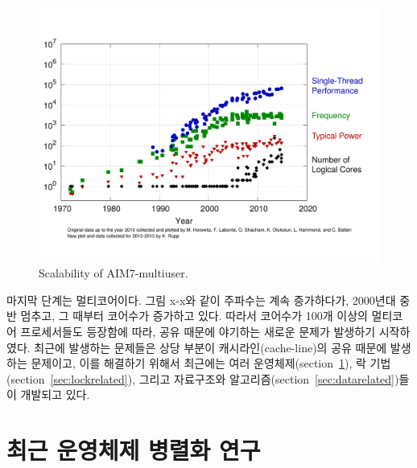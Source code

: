 \begin{figure}[h]
  \begin{center}
    \includegraphics[scale=0.3]{fig/cpu}
  \end{center}
  \caption{Scalability of AIM7-multiuser.}
  \label{fig:aim7}
\end{figure}

마지막 단계는 멀티코어이다.
그림 x-x와 같이 주파수는 계속 증가하다가, 2000년대 중반 멈추고, 그
때부터 코어수가 증가하고 있다. 
따라서 코어수가 100개 이상의 멀티코어 프로세서들도 등장함에 따라, 공유 때문에 야기하는 
새로운 문제가 발생하기 시작하였다. 
최근에 발생하는 문제들은 상당 부분이 캐시라인(cache-line)의 공유 때문에 발생하는 문제이고, 
이를 해결하기 위해서 최근에는 여러 운영체제(section~\ref{sec:osrelated}),
 락 기법(section~\ref{sec:lockrelated}), 그리고 자료구조와
 알고리즘(section~\ref{sec:datarelated})들이 개발되고 있다.


\newpage
\section{최근 운영체제 병렬화 연구}
\label{sec:osrelated}

%
 
